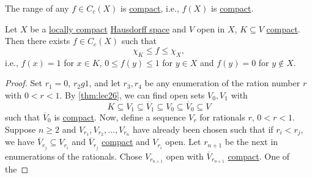 \begin{remark}
	The range of any \(f\in C_c(X)\) is \hyperref[def:compact]{compact}, i.e., \(f(X)\) is \hyperref[def:compact]{compact}.
\end{remark}

\begin{theorem}\label{thm:Urysohn-lemma}
	Let \(X\) be a \hyperref[def:locally-compact]{locally compact} \hyperref[def:Hausdorff]{Hausdorff space} and \(V\) open in \(X\), \(K \subseteq V\) \hyperref[def:compact]{compact}. Then there exists \(f\in C_c(X)\) such that
	\[
		\chi _K \leq f \leq \chi _X,
	\]
	i.e., \(f(x) = 1\) for \(x\in K\), \(0 \leq f(y) \leq 1\) for \(y\in X\) and \(f(y) = 0\) for \(y \notin X\).
\end{theorem}
\begin{proof}
	Set \(r_1 = 0\), \(r_2 g 1\), and let \(r_3, r_4 \) be any enumeration of the ration number \(r\) with \(0 < r < 1\). By \autoref{thm:lec26}, we can find open sets \(V_0, V_1\) with
	\[
		K \subseteq V_1 \subseteq \overline{V} _1 \subseteq V_0 \subseteq \overline{V} _0 \subseteq V
	\]
	such that \(\overline{V} _0\) is \hyperref[def:compact]{compact}. Now, define a sequence \(V_r\) for rationals \(r\), \(0 < r < 1\). Suppose \(n \geq 2\) and \(V_{r_1}, V_{r_2}, \ldots  , V_{r_n}\) have already been chosen such that if \(r_i < r_j\), we have \(\overline{V}_{r_j} \subseteq V_{r_i}\) and \(\overline{V} _{r_j}\) \hyperref[def:compact]{compact} and \(V_{r_i}\) open. Let \(r_{n+1}\) be the next in enumerations of the rationals. Chose \(V_{r_{n+1}}\) open with \(\overline{V} _{r_{n+1}}\) \hyperref[def:compact]{compact}. One of the


\end{proof}
